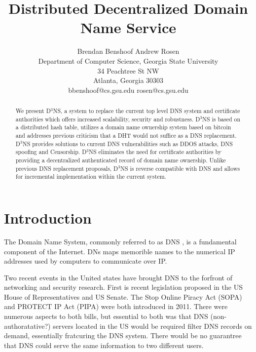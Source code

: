 \documentclass[11pt]{IEEEtran} %
\title{Distributed Decentralized Domain Name Service}
\author{
Brendan Benshoof \qquad Andrew Rosen  \\Department of Computer Science, Georgia State University\\ 34 Peachtree St NW \\ Atlanta, Georgia 30303\\  bbenshoof@cs.gsu.edu \qquad rosen@cs.gsu.edu }
\begin{document}
\maketitle

\begin{abstract}

We present D$^{3}$NS, a system to replace the current top level DNS system and certificate authorities which offers increased scalability, security and robustness. D$^{3}$NS is based on a distributed hash table, utilizes a domain name ownership system based on bitcoin and addresses previous criticism that a DHT would not suffice as a DNS replacement. D$^{3}$NS provides solutions to current DNS vulnerabilities such as DDOS attacks, DNS spoofing and Censorship. D$^{3}$NS eliminates the need for certificate authorities by providing a decentralized authenticated record of domain name ownership. Unlike previous DNS replacement proposals, D$^{3}$NS is reverse compatible with DNS and allows for incremental implementation within the current system.





\end{abstract}


\section{Introduction}
The Domain Name System, commonly referred to as DNS \cite{mockapetris2003rfc} \cite{mockapetris2004rfc}, is a fundamental component of the Internet.  DNs maps memorible names to the numerical IP addresses used by computers to communicate over IP. 

Two recent events in the United states have brought DNS to the forfront of networking and security research.  First is recent legislation proposed in the US House of Representatives and US Senate. The Stop Online Piracy Act (SOPA) \cite{sopa} and PROTECT IP Act (PIPA) \cite{pipa} were both introduced in 2011.  There were numerous aspects to both bills, but essential to both was that DNS (non-authoratative?) servers located in the US would be required filter DNS records on demand, essentially fratcuring the DNS system.  There would be no guarantree that DNS could serve the same information to two different users.
\end{document}
